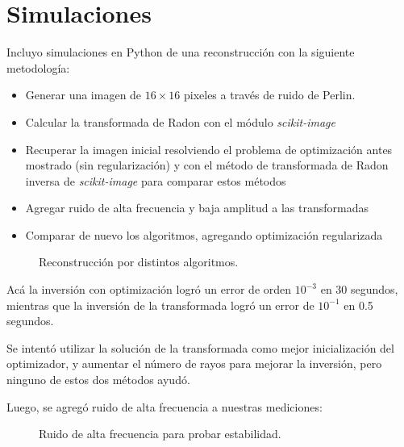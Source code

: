 \section{Simulaciones}
Incluyo simulaciones en Python de una reconstrucción con la siguiente metodología:
\begin{itemize}
    \item Generar una imagen de $16\times 16$ pixeles a través de ruido de Perlin.
    \item Calcular la transformada de Radon con el módulo \textit{scikit-image} \citep{scikit-image}
    \item Recuperar la imagen inicial resolviendo el problema de optimización antes mostrado (sin regularización) y con el método de transformada de Radon inversa de \textit{scikit-image} para comparar estos métodos
    \item Agregar ruido de alta frecuencia y baja amplitud a las transformadas
    \item Comparar de nuevo los algoritmos, agregando optimización regularizada
\end{itemize}
\begin{figure}\centering
{}\hfill 
{}
\label{fig}
\end{figure}
\begin{figure}\centering
{}\hfill
{}
\caption{Reconstrucción por distintos algoritmos.}
\label{fig}
\end{figure}

Acá la inversión con optimización logró un error de orden $10^{-3}$ en 30 segundos, mientras que la inversión de la transformada logró un error de $10^{-1}$ en 0.5 segundos.

Se intentó utilizar la solución de la transformada como mejor inicialización del optimizador, y aumentar el número de rayos para mejorar la inversión, pero ninguno de estos dos métodos ayudó.

Luego, se agregó ruido de alta frecuencia a nuestras mediciones:
\begin{figure}\centering
{}\hfill
{}
\caption{Ruido de alta frecuencia para probar estabilidad.}
\label{fig}
\end{figure}

